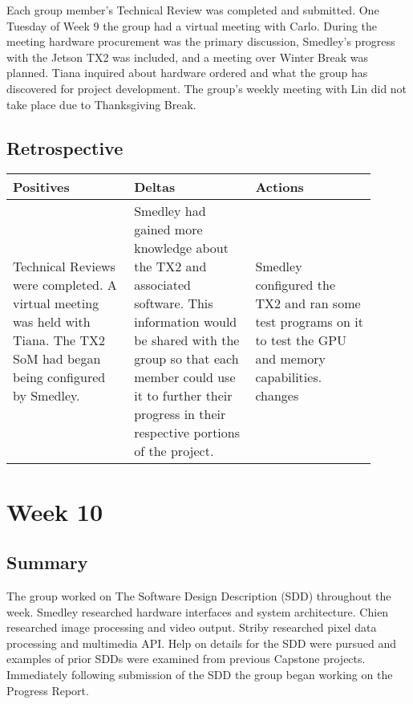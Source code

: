 \documentclass[letterpaper,10pt,serif,draftclsnofoot,onecolumn,compsoc,titlepage]{IEEEtran}
\begin{document}
Each group member's Technical Review was completed and submitted. One Tuesday of Week 
9 the group had a virtual meeting with Carlo. During the meeting hardware procurement 
was the primary discussion, Smedley's progress with the Jetson TX2 was included, and 
a meeting over Winter Break was planned. Tiana inquired about hardware ordered and 
what the group has discovered for project development. The group's weekly meeting with 
Lin did not take place due to Thanksgiving Break. \\

\subsection{Retrospective}

\begin{tabular}{|p{0.3\linewidth}|p{0.3\linewidth}|p{0.3\linewidth}|}
   \hline
   \textbf{Positives} & \textbf{Deltas} & \textbf{Actions}\\ 
   \hline
   Technical Reviews were completed. A virtual meeting was held with Tiana. The 
   TX2 SoM had began being configured by Smedley.  
   & 
   Smedley had gained more knowledge about the TX2 and associated software. This information would be shared with the group so that each member could use it to further their progress in their respective portions of the project.
   & 
   Smedley configured the TX2 and ran some test programs on it to test the GPU and memory capabilities.
   changes \\
   \hline
\end{tabular}

\section{Week 10}

\subsection{Summary}

The group worked on The Software Design Description (SDD) throughout the week. Smedley 
researched hardware interfaces and system architecture. Chien researched image 
processing and video output. Striby researched pixel data processing and multimedia 
API. Help on details for the SDD were pursued and examples of prior SDDs were examined 
from previous Capstone projects. Immediately following submission of the SDD the 
group began working on the Progress Report. \\
\end{document}
